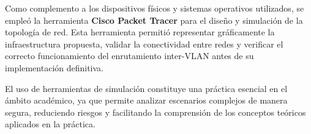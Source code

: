 Como complemento a los dispositivos físicos y sistemas operativos utilizados, se empleó la herramienta \textbf{Cisco Packet Tracer} para el diseño y simulación de la topología de red. Esta herramienta permitió representar gráficamente la infraestructura propuesta, validar la conectividad entre redes y verificar el correcto funcionamiento del enrutamiento inter-VLAN antes de su implementación definitiva.

El uso de herramientas de simulación constituye una práctica esencial en el ámbito académico, ya que permite analizar escenarios complejos de manera segura, reduciendo riesgos y facilitando la comprensión de los conceptos teóricos aplicados en la práctica.
